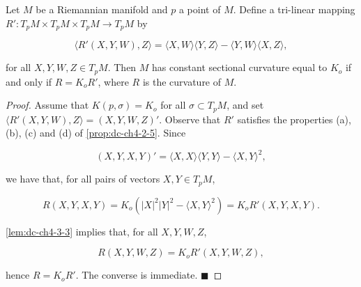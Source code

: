 \begin{lemma}
  \label{lem:dc-ch4-3-4}
  \leanok
  Let $M$ be a Riemannian manifold and $p$ a point of $M$. Define a tri-linear
  mapping $R':T_pM\times T_pM\times T_pM\to T_pM$ by
  
  $$
  \langle R'(X,Y,W),Z\rangle=\langle X,W\rangle\langle Y,Z\rangle-\langle Y,W\rangle\langle X,Z\rangle,
  $$
  
  for all $X,Y,W,Z\in T_pM$. Then $M$ has constant sectional curvature equal to
  $K_o$ if and only if $R=K_o R'$, where $R$ is the curvature of $M$.
\end{lemma}
\begin{proof}
  \leanok
  \sketch
  Assume that $K(p,\sigma)=K_o$ for all $\sigma\subset T_pM$, and set
  $\langle R'(X,Y,W),Z\rangle=(X,Y,W,Z)'$. Observe that $R'$ satisfies the properties
  (a), (b), (c) and (d) of \cref{prop:dc-ch4-2-5}. Since
  
  $$
  (X,Y,X,Y)'=\langle X,X\rangle\langle Y,Y\rangle-\langle X,Y\rangle^2,
  $$
  
  we have that, for all pairs of vectors $X,Y\in T_pM$,
  
  $$
  R(X,Y,X,Y)=K_o(|X|^2|Y|^2-\langle X,Y\rangle^2)=K_o R'(X,Y,X,Y).
  $$
  
  \cref{lem:dc-ch4-3-3} implies that, for all $X,Y,W,Z$,
  
  $$
  R(X,Y,W,Z)=K_o R'(X,Y,W,Z),
  $$
  
  hence $R=K_o R'$. The converse is immediate. $\blacksquare$
\end{proof}

